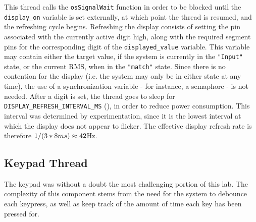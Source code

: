 This thread calls the \verb|osSignalWait| function in order to be blocked until the \verb|display_on| variable is set externally, at which point the thread is resumed, and the refreshing cycle begins. Refreshing the display consists of setting the pin associated with the currently active digit high, along with the required segment pins for the corresponding digit of the \verb|displayed_value| variable. This variable may contain either the target value, if the system is currently in the \verb|"Input"| state, or the current RMS, when in the \verb|"match"| state. Since there is no contention for the display (i.e. the system may only be in either state at any time), the use of a synchronization variable - for instance, a semaphore - is not needed. After a digit is set, the thread goes to sleep for \verb|DISPLAY_REFRESH_INTERVAL_MS| (\DISPLAYREFRESHINTERVAL), in order to reduce power consumption. This interval was determined by experimentation, since it is the lowest interval at which the display does not appear to flicker. The effective display refresh rate is therefore $ 1/(3 * 8ms) \approx 42$Hz.





\pagebreak
\subsection{Keypad Thread}


\def \CHECKFORDIGITPRESSINTERVALMS {25ms}
The keypad was without a doubt the most challenging portion of this lab. The complexity of this component stems from the need for the system to debounce each keypress, as well as keep track of the amount of time each key has been pressed for. 

